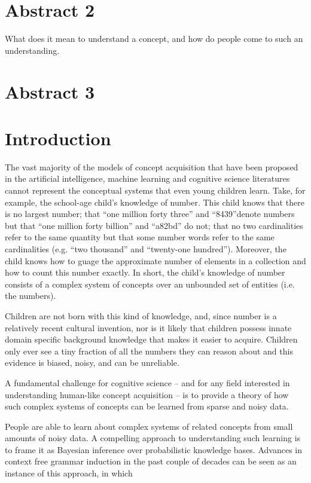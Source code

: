 \documentclass{article}
\begin{document}
\section{Abstract 2}
What does it mean to understand a concept, and how do people come to
such an understanding.

\section{Abstract 3}



\section{Introduction}
The vast majority of the models of concept acquisition that have been
proposed in the artificial intelligence, machine learning and
cognitive science literatures cannot represent the conceptual systems
that even young children learn. Take, for example, the school-age
child's knowledge of number. This child knows that there is no largest
number; that ``one million forty three'' and ``8439''denote numbers
but that ``one million forty billion'' and ``a82bd'' do not; that no
two cardinalities refer to the same quantity but that some number
words refer to the same cardinalities (e.g. ``two thousand'' and
``twenty-one hundred''). Moreover, the child knows how to guage the
approximate number of elements in a collection and how to count this
number exactly. In short, the child's knowledge of number consists of
a complex system of concepts over an unbounded set of entities
(i.e. the numbers). 

Children are not born with this kind of knowledge, and, since number
is a relatively recent cultural invention, nor is it likely that
children possess innate domain specific background knowledge that
makes it easier to acquire. Children only ever see a tiny fraction of
all the numbers they can reason about and this evidence is biased,
noisy, and can be unreliable. 

A fundamental challenge for cognitive science -- and for any field
interested in understanding human-like concept acquisition -- is to
provide a theory of how such complex systems of concepts can be
learned from sparse and noisy data.

People are able to learn about complex systems of related
concepts from small amounts of noisy data. A compelling approach to
understanding such learning is to frame it as Bayesian inference over
probabilistic knowledge bases. Advances in context free grammar
induction in the past couple of decades can be seen as an instance of
this approach, in which
\end{document}
